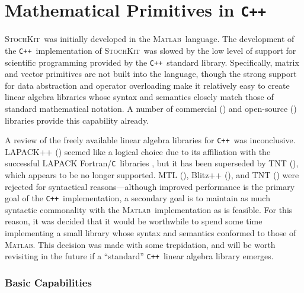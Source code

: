 \documentclass[12pt]{article}
\newcommand{\matlab}{\textsc{Matlab}}
\newcommand{\cpp}{\texttt{C++}}%
\newcommand{\clang}{\texttt{C}}%
\newcommand{\sspack}{\textsc{StochKit}}
\begin{document}
\section{Mathematical Primitives in \cpp} \label{cpp_implementation}

\sspack \ was initially developed in the \matlab\ language\cite{Hallthesis}.
The development of the \cpp\ implementation of \sspack \
was slowed by the low level of support for scientific
programming provided by the \cpp\ standard library.  Specifically,
matrix and vector primitives are not built into the language, though
the strong support for data abstraction and operator overloading make
it relatively easy to create linear algebra libraries whose syntax and
semantics closely match those of standard mathematical notation.  A
number of commercial (\cite{roguewave}) and open-source (\cite{MTL,
TNT, blitz++, POOMA, lapack++}) libraries provide this capability
already.

A review of the freely available linear algebra libraries for \cpp\
was inconclusive.  LAPACK++ (\cite{lapack++}) seemed like a logical
choice due to its affiliation with the successful LAPACK
Fortran/\clang\  libraries \cite{lapack}, but it has been superseded by TNT
(\cite{TNT}), which appears to be no longer supported.  MTL
(\cite{MTL}), Blitz++ (\cite{blitz++}), and TNT (\cite{TNT}) were
rejected for syntactical reasons---although improved performance is
the primary goal of the \cpp\ implementation, a secondary goal is to
maintain as much syntactic commonality with the \matlab\
implementation as is feasible.  For this reason, it was decided that
it would be worthwhile to spend some time implementing a small library
whose syntax and semantics conformed to those of \matlab.  This
decision was made with some trepidation, and will be worth revisiting
in the future if a ``standard'' \cpp\ linear algebra library emerges.

\subsubsection{Basic Capabilities}
\end{document}
